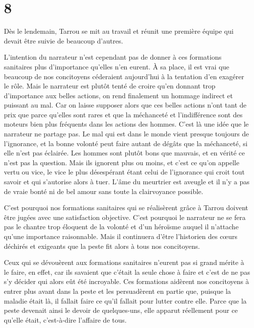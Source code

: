 \documentclass[french,twoside]{book} %
\begin{document}
\section[{8}]{8}
\noindent Dès le lendemain, Tarrou se mit au travail et réunit une première équipe qui devait être suivie de beaucoup d’autres.\par
L’intention du narrateur n’est cependant pas de donner à ces formations sanitaires plus d’importance qu’elles n’en eurent. À sa place, il est vrai que beaucoup de nos concitoyens céderaient aujourd’hui à la tentation d’en exagérer le rôle. Mais le narrateur est plutôt tenté de croire qu’en donnant trop d’importance aux belles actions, on rend finalement un hommage indirect et puissant au mal. Car on laisse supposer alors que ces belles actions n’ont tant de prix que parce qu’elles sont rares et que la méchanceté et l’indifférence sont des moteurs bien plus fréquents dans les actions des hommes. C’est là une idée que le narrateur ne partage pas. Le mal qui est dans le monde vient presque toujours de l’ignorance, et la bonne volonté peut faire autant de dégâts que la méchanceté, si elle n’est pas éclairée. Les hommes sont plutôt bons que mauvais, et en vérité ce n’est pas la question. Mais ils ignorent plus ou moins, et c’est ce qu’on appelle vertu ou vice, le vice le plus désespérant étant celui de l’ignorance qui croit tout savoir et qui s’autorise alors à tuer. L’âme du meurtrier est aveugle et il n’y a pas de vraie bonté ni de bel amour sans toute la clairvoyance possible.\par
C’est pourquoi nos formations sanitaires qui se réalisèrent grâce à Tarrou doivent être jugées avec une satisfaction objective. C’est pourquoi le narrateur ne se fera pas le chantre trop éloquent de la volonté et d’un héroïsme auquel il n’attache qu’une importance raisonnable. Mais il continuera d’être l’historien des cœurs déchirés et exigeants que la peste fit alors à tous nos concitoyens.\par
Ceux qui se dévouèrent aux formations sanitaires n’eurent pas si grand mérite à le faire, en effet, car ils savaient que c’était la seule chose à faire et c’est de ne pas s’y décider qui alors eût été incroyable. Ces formations aidèrent nos concitoyens à entrer plus avant dans la peste et les persuadèrent en partie que, puisque la maladie était là, il fallait faire ce qu’il fallait pour lutter contre elle. Parce que la peste devenait ainsi le devoir de quelques-uns, elle apparut réellement pour ce qu’elle était, c’est-à-dire l’affaire de tous.\par
\end{document}
